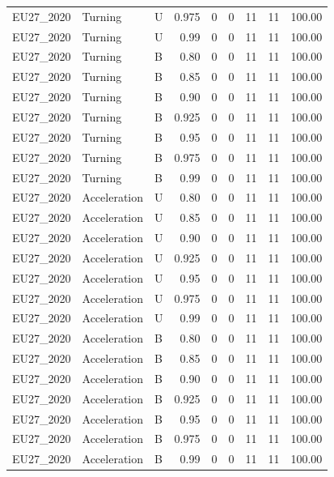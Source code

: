 \begin{longtable}{lllrrrrrr}
EU27\_2020 & Turning & U & 0.975 & 0 & 0 & 11 & 11 & 100.00 \\
EU27\_2020 & Turning & U & 0.99 & 0 & 0 & 11 & 11 & 100.00 \\
EU27\_2020 & Turning & B & 0.80 & 0 & 0 & 11 & 11 & 100.00 \\
EU27\_2020 & Turning & B & 0.85 & 0 & 0 & 11 & 11 & 100.00 \\
EU27\_2020 & Turning & B & 0.90 & 0 & 0 & 11 & 11 & 100.00 \\
EU27\_2020 & Turning & B & 0.925 & 0 & 0 & 11 & 11 & 100.00 \\
EU27\_2020 & Turning & B & 0.95 & 0 & 0 & 11 & 11 & 100.00 \\
EU27\_2020 & Turning & B & 0.975 & 0 & 0 & 11 & 11 & 100.00 \\
EU27\_2020 & Turning & B & 0.99 & 0 & 0 & 11 & 11 & 100.00 \\
EU27\_2020 & Acceleration & U & 0.80 & 0 & 0 & 11 & 11 & 100.00 \\
EU27\_2020 & Acceleration & U & 0.85 & 0 & 0 & 11 & 11 & 100.00 \\
EU27\_2020 & Acceleration & U & 0.90 & 0 & 0 & 11 & 11 & 100.00 \\
EU27\_2020 & Acceleration & U & 0.925 & 0 & 0 & 11 & 11 & 100.00 \\
EU27\_2020 & Acceleration & U & 0.95 & 0 & 0 & 11 & 11 & 100.00 \\
EU27\_2020 & Acceleration & U & 0.975 & 0 & 0 & 11 & 11 & 100.00 \\
EU27\_2020 & Acceleration & U & 0.99 & 0 & 0 & 11 & 11 & 100.00 \\
EU27\_2020 & Acceleration & B & 0.80 & 0 & 0 & 11 & 11 & 100.00 \\
EU27\_2020 & Acceleration & B & 0.85 & 0 & 0 & 11 & 11 & 100.00 \\
EU27\_2020 & Acceleration & B & 0.90 & 0 & 0 & 11 & 11 & 100.00 \\
EU27\_2020 & Acceleration & B & 0.925 & 0 & 0 & 11 & 11 & 100.00 \\
EU27\_2020 & Acceleration & B & 0.95 & 0 & 0 & 11 & 11 & 100.00 \\
EU27\_2020 & Acceleration & B & 0.975 & 0 & 0 & 11 & 11 & 100.00 \\
EU27\_2020 & Acceleration & B & 0.99 & 0 & 0 & 11 & 11 & 100.00 \\
\end{longtable}

\endgroup
